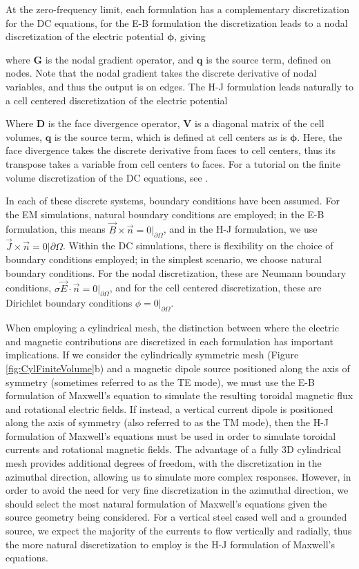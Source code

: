 At the zero-frequency limit, each formulation has a complementary discretization for the DC equations, for the E-B formulation the discretization leads to a nodal discretization of the electric potential $\boldsymbol{\phi}$, giving

where $\mathbf{G}$ is the nodal gradient operator, and $\mathbf{q}$ is the source term, defined on nodes. Note that the nodal gradient takes the discrete derivative of nodal variables, and thus the output is on edges. The H-J formulation leads naturally to a cell centered discretization of the electric potential

Where $\mathbf{D}$ is the face divergence operator, $\mathbf{V}$ is a diagonal matrix of the cell volumes, $\mathbf{q}$ is the source term, which is  defined at cell centers as is $\boldsymbol{\phi}$. Here, the face divergence takes the discrete derivative from faces to cell centers, thus its transpose takes a variable from cell centers to faces. For a tutorial on the finite volume discretization of the DC equations, see \citep{Cockett2016}.

In each of these discrete systems, boundary conditions have been assumed. For the EM simulations, natural boundary conditions are employed; in the E-B formulation, this means $\vec{B}\times\vec{n} = 0\vert_{\partial \Omega}$, and in the H-J formulation, we use $\vec{J}\times\vec{n} = 0\vert{\partial \Omega}$. Within the DC simulations, there is flexibility on the choice of boundary conditions employed; in the simplest scenario, we choose natural boundary conditions. For the nodal discretization, these are Neumann boundary conditions, $\sigma\vec{E} \cdot \vec{n} = 0\vert_{\partial \Omega}$, and for the cell centered discretization, these are Dirichlet boundary conditions $\phi = 0\vert_{\partial \Omega}$.

When employing a cylindrical mesh, the distinction between where the electric and magnetic contributions are discretized in each formulation has important implications. If we consider the cylindrically symmetric mesh (Figure \ref{fig:CylFiniteVolume}b) and a magnetic dipole source positioned along the axis of symmetry (sometimes referred to as the TE mode), we must use the E-B formulation of Maxwell's equation to simulate the resulting toroidal magnetic flux and rotational electric fields. If instead, a vertical current dipole is positioned along the axis of symmetry (also referred to as the TM mode), then the H-J formulation of Maxwell's equations must be used in order to simulate toroidal currents and rotational magnetic fields. The advantage of a fully 3D cylindrical mesh provides additional degrees of freedom, with the discretization in the azimuthal direction, allowing us to simulate more complex responses. However, in order to avoid the need for very fine discretization in the azimuthal direction, we should select the most natural formulation of Maxwell's equations given the source geometry being considered. For a vertical steel cased well and a grounded source, we expect the majority of the currents to flow vertically and radially, thus the more natural discretization to employ is the H-J formulation of Maxwell's equations.

